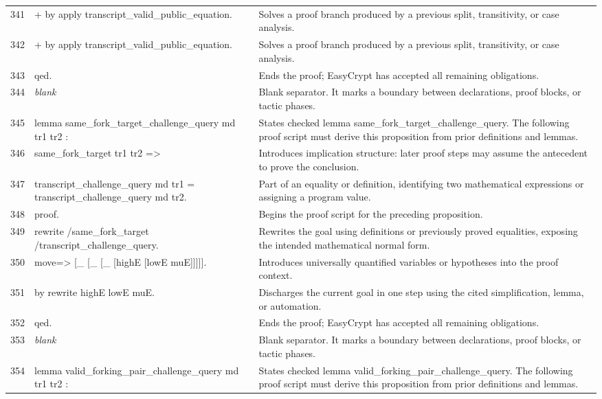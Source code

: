 \documentclass[10pt]{article}
\begin{document}
\begin{longtable}{r L{0.53\textwidth} L{0.37\textwidth}}
341 & {\ttfamily\scriptsize + by apply transcript\_valid\_public\_equation.} & Solves a proof branch produced by a previous split, transitivity, or case analysis. \\
342 & {\ttfamily\scriptsize + by apply transcript\_valid\_public\_equation.} & Solves a proof branch produced by a previous split, transitivity, or case analysis. \\
343 & {\ttfamily\scriptsize qed.} & Ends the proof; EasyCrypt has accepted all remaining obligations. \\
344 & {\ttfamily\scriptsize \emph{blank}} & Blank separator.  It marks a boundary between declarations, proof blocks, or tactic phases. \\
345 & {\ttfamily\scriptsize lemma same\_fork\_target\_challenge\_query md tr1 tr2 :} & States checked lemma same\_fork\_target\_challenge\_query.  The following proof script must derive this proposition from prior definitions and lemmas. \\
346 & {\ttfamily\scriptsize   same\_fork\_target tr1 tr2 =>} & Introduces implication structure: later proof steps may assume the antecedent to prove the conclusion. \\
347 & {\ttfamily\scriptsize   transcript\_challenge\_query md tr1 = transcript\_challenge\_query md tr2.} & Part of an equality or definition, identifying two mathematical expressions or assigning a program value. \\
348 & {\ttfamily\scriptsize proof.} & Begins the proof script for the preceding proposition. \\
349 & {\ttfamily\scriptsize rewrite /same\_fork\_target /transcript\_challenge\_query.} & Rewrites the goal using definitions or previously proved equalities, exposing the intended mathematical normal form. \\
350 & {\ttfamily\scriptsize move=> [\_ [\_ [\_ [highE [lowE muE]]]]].} & Introduces universally quantified variables or hypotheses into the proof context. \\
351 & {\ttfamily\scriptsize by rewrite highE lowE muE.} & Discharges the current goal in one step using the cited simplification, lemma, or automation. \\
352 & {\ttfamily\scriptsize qed.} & Ends the proof; EasyCrypt has accepted all remaining obligations. \\
353 & {\ttfamily\scriptsize \emph{blank}} & Blank separator.  It marks a boundary between declarations, proof blocks, or tactic phases. \\
354 & {\ttfamily\scriptsize lemma valid\_forking\_pair\_challenge\_query md tr1 tr2 :} & States checked lemma valid\_forking\_pair\_challenge\_query.  The following proof script must derive this proposition from prior definitions and lemmas. \\

\end{longtable}
\end{document}
